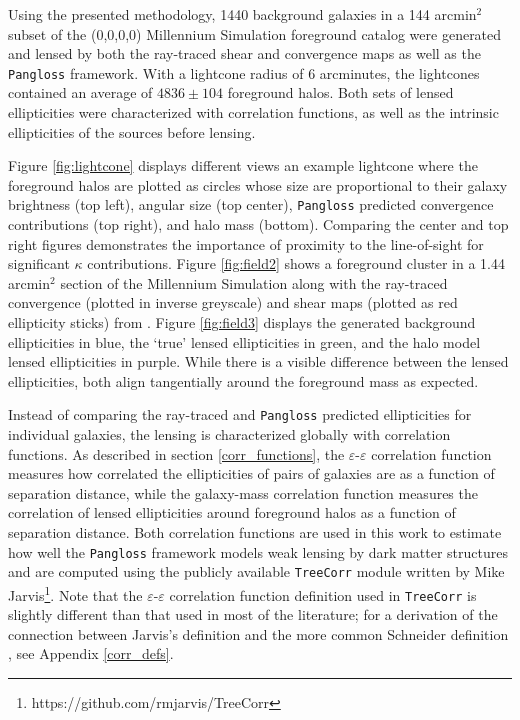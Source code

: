 \documentclass[%
 reprint,
 amsmath,amssymb,
 aps,nofootinbib
]{revtex4-1}
\begin{document}
Using the presented methodology, 1440 background galaxies in a 144 arcmin$^2$ subset of the (0,0,0,0) Millennium Simulation foreground catalog were generated and lensed by both the ray-traced shear and convergence maps as well as the \texttt{Pangloss} framework. With a lightcone radius of 6 arcminutes, the lightcones contained an average of ${4836\pm104}$ foreground halos. Both sets of lensed ellipticities were characterized with correlation functions, as well as the intrinsic ellipticities of the sources before lensing.

Figure \ref{fig:lightcone} displays different views an example lightcone where the foreground halos are plotted as circles whose size are proportional to their galaxy brightness (top left), angular size (top center), \texttt{Pangloss} predicted convergence contributions (top right), and halo mass (bottom). Comparing the center and top right figures demonstrates the importance of proximity to the line-of-sight for significant $\kappa$ contributions. Figure \ref{fig:field2} shows a foreground cluster in a 1.44 arcmin$^2$ section of the Millennium Simulation along with the ray-traced convergence (plotted in inverse greyscale) and shear maps (plotted as red ellipticity sticks) from \cite{ray_tracing}. Figure \ref{fig:field3} displays the generated background ellipticities in blue, the `true' lensed ellipticities in green, and the halo model lensed ellipticities in purple. While there is a visible difference between the lensed ellipticities, both align tangentially around the foreground mass as expected.

Instead of comparing the ray-traced and \texttt{Pangloss} predicted ellipticities for individual galaxies, the lensing is characterized globally with correlation functions. As described in section \ref{corr_functions}, the $\varepsilon$-$\varepsilon$ correlation function measures how correlated the ellipticities of pairs of galaxies are as a function of separation distance, while the galaxy-mass correlation function measures the correlation of lensed ellipticities around foreground halos as a function of separation distance. Both correlation functions are used in this work to estimate how well the \texttt{Pangloss} framework models weak lensing by dark matter structures and are computed using the publicly available \texttt{TreeCorr} module written by Mike Jarvis\footnote{https://github.com/rmjarvis/TreeCorr}. Note that the $\varepsilon$-$\varepsilon$ correlation function definition used in \texttt{TreeCorr} is slightly different than that used in most of the literature; for a derivation of the connection between Jarvis's definition \cite{jarvis} and the more common Schneider definition \cite{schneider}, see Appendix \ref{corr_defs}.
\end{document}
